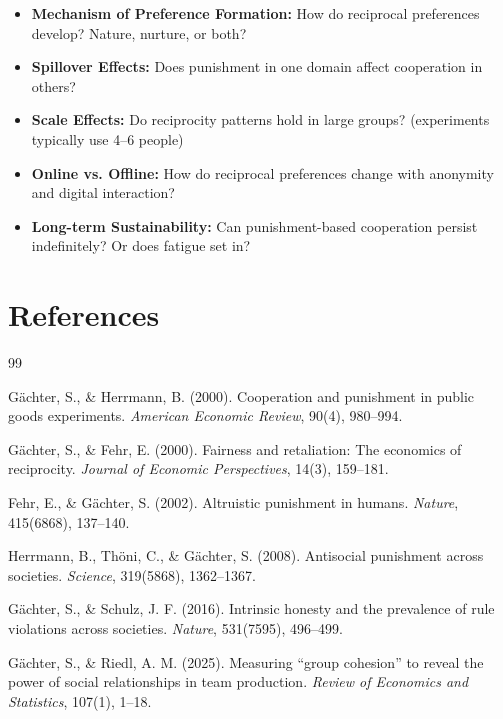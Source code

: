 \documentclass[11pt]{article}
\begin{document}
\begin{itemize}
    \item \textbf{Mechanism of Preference Formation:} How do reciprocal preferences
          develop? Nature, nurture, or both?

    \item \textbf{Spillover Effects:} Does punishment in one domain affect
          cooperation in others?

    \item \textbf{Scale Effects:} Do reciprocity patterns hold in large groups?
          (experiments typically use 4–6 people)

    \item \textbf{Online vs. Offline:} How do reciprocal preferences change
          with anonymity and digital interaction?

    \item \textbf{Long-term Sustainability:} Can punishment-based cooperation
          persist indefinitely? Or does fatigue set in?
\end{itemize}

\section*{References}

\begin{thebibliography}{99}

 Gächter, S., \& Herrmann, B. (2000).
Cooperation and punishment in public goods experiments.
\textit{American Economic Review}, 90(4), 980--994.

 Gächter, S., \& Fehr, E. (2000).
Fairness and retaliation: The economics of reciprocity.
\textit{Journal of Economic Perspectives}, 14(3), 159--181.

 Fehr, E., \& Gächter, S. (2002).
Altruistic punishment in humans.
\textit{Nature}, 415(6868), 137--140.

 Herrmann, B., Thöni, C., \& Gächter, S. (2008).
Antisocial punishment across societies.
\textit{Science}, 319(5868), 1362--1367.

 Gächter, S., \& Schulz, J. F. (2016).
Intrinsic honesty and the prevalence of rule violations across societies.
\textit{Nature}, 531(7595), 496--499.

 Gächter, S., \& Riedl, A. M. (2025).
Measuring ``group cohesion'' to reveal the power of social relationships in team production.
\textit{Review of Economics and Statistics}, 107(1), 1--18.

\end{thebibliography}
\end{document}
